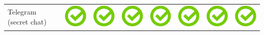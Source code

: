 \documentclass[10pt,foldmark,tumble]{leaflet}
\begin{document}
{{\begin{tabular}{ L{2cm} | C{2cm} | C{2cm} | C{2cm} | C{2cm} | C{2cm} | C{2cm} | C{2cm} | }
Telegram (secret chat) & \includegraphics[scale=0.1]{pics/haken.png} & \includegraphics[scale=0.1]{pics/haken.png} & \includegraphics[scale=0.1]{pics/haken.png} & \includegraphics[scale=0.1]{pics/haken.png} & \includegraphics[scale=0.1]{pics/haken.png} & \includegraphics[scale=0.1]{pics/haken.png} & \includegraphics[scale=0.1]{pics/haken.png} \tabularnewline

\end{tabular}}}
\end{document}
